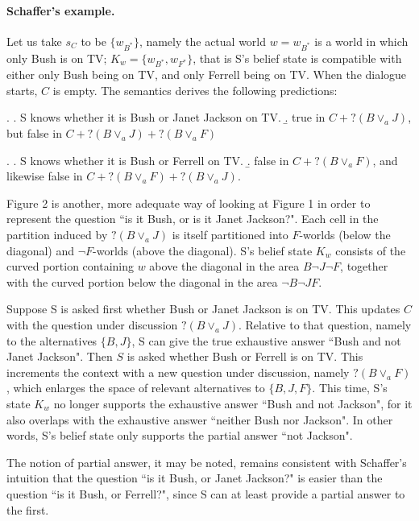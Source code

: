 
\paragraph{Schaffer's example.} Let us take $s_C$ to be $\{w_{B^{*}}\}$, namely
the actual world $w=w_{B^{*}}$ is a world in which only Bush is on
TV; $K_w= \{w_{B^{*}}, w_{F^{*}}\}$, that is S's belief state is
compatible with either only Bush being on TV, and only Ferrell
being on TV. When the dialogue starts, $C$ is empty. The semantics
derives the following predictions:

\ex. \a. S knows whether it is Bush or Janet Jackson on TV. \b.
true in $C + ?(B \vee_a J)$, but false in $C +  ? (B \vee_a J) + ?
(B \vee_a F)$

\ex. \a. S knows whether it is Bush or Ferrell on TV. \b. false in
$C + ?(B \vee_a F)$, and likewise false in $C + ?(B \vee_a F) +
?(B\vee_a J)$.

\enlargethispage{1cm}



Figure 2 is another, more adequate way of looking at Figure 1 in
order to represent the question ``is it Bush, or is it Janet
Jackson?". Each cell in the partition induced by $?(B\vee_{a} J)$
is itself partitioned into $F$-worlds (below the diagonal) and
$\neg F$-worlds (above the diagonal). S's belief state $K_w$
consists of the curved portion containing $w$ above the diagonal
in the area $B\neg J \neg F$, together with the curved portion
below the diagonal in the area $\neg B \neg J F$.

Suppose S is asked first whether Bush or Janet Jackson is on TV.
This updates $C$ with the question under discussion $?(B\vee_a
J)$. Relative to that question, namely to the alternatives
$\{B,J\}$, S can give the true exhaustive answer ``Bush and not
Janet Jackson". Then $S$ is asked whether Bush or Ferrell is on
TV. This increments the context with a new question under
discussion, namely $?(B \vee_a F)$, which enlarges the space of
relevant alternatives to $\{B,J,F\}$. This time, S's state $K_w$
no longer supports the exhaustive answer ``Bush and not Jackson",
for it also overlaps with the exhaustive answer ``neither Bush nor
Jackson". In other words, S's belief state only supports the
partial answer ``not Jackson".

The notion of partial answer, it may be noted, remains consistent
with Schaffer's intuition that the question ``is it Bush, or Janet
Jackson?" is easier than the question ``is it Bush, or Ferrell?",
since S can at least provide a partial answer to the first.

